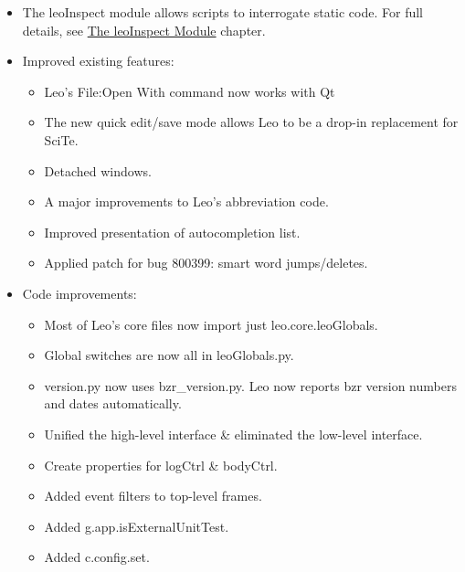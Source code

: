 \documentclass[a4paper,10pt,english]{sphinxmanual}
\begin{document}
\begin{itemize}
\item {} 
The leoInspect module allows scripts to interrogate static code.
For full details, see \href{http://webpages.charter.net/edreamleo/leoInspect.html}{The leoInspect Module} chapter.

\item {} 
Improved existing features:
\begin{itemize}
\item {} 
Leo's File:Open With command now works with Qt

\item {} 
The new quick edit/save mode allows Leo to be a drop-in replacement for SciTe.

\item {} 
Detached windows.

\item {} 
A major improvements to Leo's abbreviation code.

\item {} 
Improved presentation of autocompletion list.

\item {} 
Applied patch for bug 800399: smart word jumps/deletes.

\end{itemize}

\item {} 
Code improvements:
\begin{itemize}
\item {} 
Most of Leo's core files now import just leo.core.leoGlobals.

\item {} 
Global switches are now all in leoGlobals.py.

\item {} 
version.py now uses bzr\_version.py. Leo now reports bzr version numbers and dates automatically.

\item {} 
Unified the high-level interface \& eliminated the low-level interface.

\item {} 
Create properties for logCtrl \& bodyCtrl.

\item {} 
Added event filters to top-level frames.

\item {} 
Added g.app.isExternalUnitTest.

\item {} 
Added c.config.set.


\end{itemize}
\end{itemize}
\end{document}
